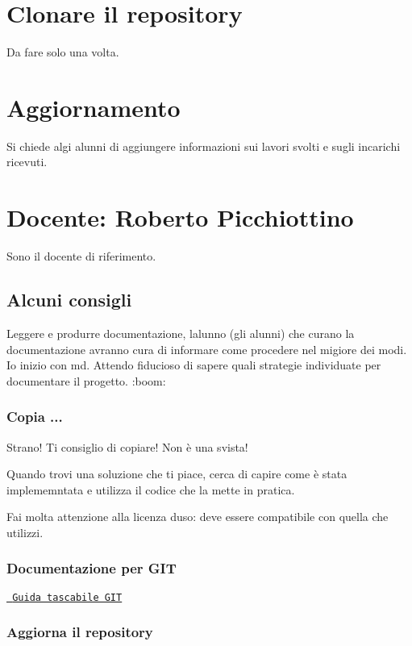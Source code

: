 \section*{Clonare il repository}

Da fare solo una volta. 
\begin{DoxyCode}{0}
\end{DoxyCode}
 \section*{Aggiornamento}

Si chiede algi alunni di aggiungere informazioni sui lavori svolti e sugli incarichi ricevuti.

\section*{Docente\+: Roberto Picchiottino}

Sono il docente di riferimento.

\subsection*{Alcuni consigli}

Leggere e produrre documentazione, l\textquotesingle{}alunno (gli alunni) che curano la documentazione avranno cura di informare come procedere nel migiore dei modi. Io inizio con md. Attendo fiducioso di sapere quali strategie individuate per documentare il progetto. \+:boom\+:

\subsubsection*{Copia ...}

Strano! Ti consiglio di copiare! Non è una svista!

Quando trovi una soluzione che ti piace, cerca di capire come è stata implememntata e utilizza il codice che la mette in pratica.

Fai molta attenzione alla licenza d\textquotesingle{}uso\+: deve essere compatibile con quella che utilizzi.

\subsubsection*{Documentazione per G\+IT}

\href{https://rogerdudler.github.io/git-guide/index.it.html}{\texttt{ Guida tascabile G\+IT}} \subsubsection*{Aggiorna il repository}

